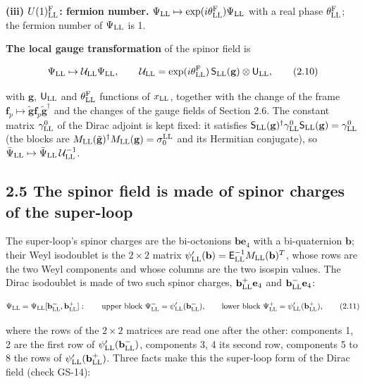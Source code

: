 \documentclass[
  10pt,
]{article}
\begin{document}
\textbf{(iii) \(U(1)^{\rm F}_{\rm LL}\): fermion number.}
\(\Psi_{\rm LL}\mapsto\exp(i\theta^{\rm F}_{\rm LL})\Psi_{\rm LL}\) with
a real phase \(\theta^{\rm F}_{\rm LL}\); the fermion number of
\(\Psi_{\rm LL}\) is 1.

\textbf{The local gauge transformation} of the spinor field is

\[\Psi_{\rm LL}\mapsto\mathcal U_{\rm LL}\Psi_{\rm LL},\qquad\mathcal U_{\rm LL}=\exp(i\theta^{\rm F}_{\rm LL})\,\mathsf S_{\rm LL}(\mathbf g)\otimes\mathsf U_{\rm LL},\tag{2.10}\]

with \(\mathbf g\), \(\mathsf U_{\rm LL}\) and
\(\theta^{\rm F}_{\rm LL}\) functions of \(x_{\rm LL}\), together with
the change of the frame
\(\mathbf f_p\mapsto\tilde{\mathbf g}\mathbf f_p\tilde{\mathbf g}^\dagger\)
and the changes of the gauge fields of Section 2.6. The constant matrix
\(\gamma^0_{\rm LL}\) of the Dirac adjoint is kept fixed: it satisfies
\(\mathsf S_{\rm LL}(\mathbf g)^\dagger\gamma^0_{\rm LL}\mathsf S_{\rm LL}(\mathbf g)=\gamma^0_{\rm LL}\)
(the blocks are
\(M_{\rm LL}(\tilde{\mathbf g})^\dagger M_{\rm LL}(\mathbf g)=\sigma^{\rm LL}_0\)
and its Hermitian conjugate), so
\(\bar\Psi_{\rm LL}\mapsto\bar\Psi_{\rm LL}\,\mathcal U_{\rm LL}^{-1}\).

\hypertarget{the-spinor-field-is-made-of-spinor-charges-of-the-super-loop}{%
\subsection{2.5 The spinor field is made of spinor charges of the
super-loop}\label{the-spinor-field-is-made-of-spinor-charges-of-the-super-loop}}

The super-loop's spinor charges are the bi-octonions
\(\mathbf b\mathbf e_4\) with a bi-quaternion \(\mathbf b\); their Weyl
isodoublet is the \(2\times2\) matrix
\(\psi'_{\rm LL}(\mathbf b)=\mathsf E_{\rm LL}^{-1}M_{\rm LL}(\mathbf b)^T\),
whose rows are the two Weyl components and whose columns are the two
isospin values. The Dirac isodoublet is made of two such spinor charges,
\(\mathbf b^+_{\rm LL}\mathbf e_4\) and
\(\mathbf b^-_{\rm LL}\mathbf e_4\):

\[\Psi_{\rm LL}=\Psi_{\rm LL}[\mathbf b^-_{\rm LL},\mathbf b^+_{\rm LL}]:\qquad\text{upper block }\Psi^-_{\rm LL}=\psi'_{\rm LL}(\mathbf b^-_{\rm LL}),\qquad\text{lower block }\Psi^+_{\rm LL}=\psi'_{\rm LL}(\mathbf b^+_{\rm LL}),\tag{2.11}\]

where the rows of the \(2\times2\) matrices are read one after the
other: components 1, 2 are the first row of
\(\psi'_{\rm LL}(\mathbf b^-_{\rm LL})\), components 3, 4 its second
row, components 5 to 8 the rows of
\(\psi'_{\rm LL}(\mathbf b^+_{\rm LL})\). Three facts make this the
super-loop form of the Dirac field (check GS-14):
\end{document}
